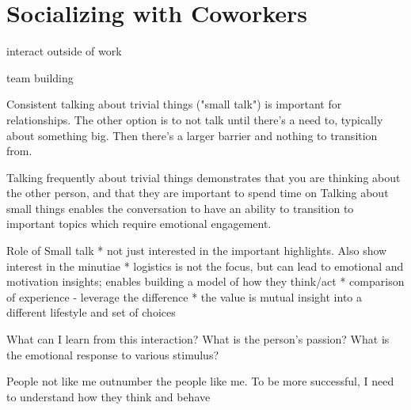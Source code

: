\section{Socializing with Coworkers\label{sec:socializing}}

interact outside of work

team building


Consistent talking about trivial things ("small talk") is important for relationships.
The other option is to not talk until there's a need to, typically about something big. Then there's a larger barrier and nothing to transition from.

Talking frequently about trivial things demonstrates that you are thinking about the other person, and that they are important to spend time on
Talking about small things enables the conversation to have an ability to transition to important topics which require emotional engagement.

Role of Small talk
* not just interested in the important highlights. Also show interest in the minutiae
* logistics is not the focus, but can lead to emotional and motivation insights; enables building a model of how they think/act
* comparison of experience - leverage the difference
* the value is mutual insight into a different lifestyle and set of choices

What can I learn from this interaction?
What is the person's passion?
What is the emotional response to various stimulus?

People not like me outnumber the people like me.
To be more successful, I need to understand how they think and behave